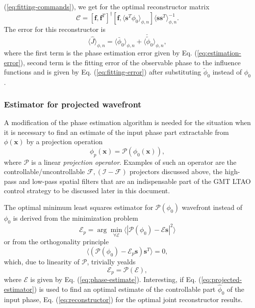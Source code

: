 (\ref{eq:fitting-commands}), we get for the optimal reconstructor matrix
\begin{equation} \label{eq:reconstructor}
	\mathcal{C} = [\bm{f},\bm{f}^{T}]^{\dagger}
	              [\bm{f}, \langle \bm{s}^{T} \phi_{0} \rangle_{\phi,n} ]
	              \langle \bm{s} \bm{s}^{T} \rangle_{\phi,n}^{-1}.
\end{equation}
The error for this reconstructor is
\begin{equation} \label{eq:reconstruction-error}
	\langle \hat{J} \rangle_{\phi,n} =
	\langle \bar{\phi}_{0} \rangle_{\phi,n} +
	\langle \check{\tilde{\phi}}_{0} \rangle_{\phi,n},
\end{equation}
where the first term is the phase estimation error given by Eq.
(\ref{eq:estimation-error}), second term is the fitting error of the
observable phase to the influence functions and is given by Eq.
(\ref{eq:fitting-error}) after substituting $\tilde{\phi}_{0}$ instead of
$\phi_{0}$.

\subsubsection{Estimator for projected wavefront}

A modification of the phase estimation algorithm is needed for the situation
when it is necessary to find an estimate of the input phase part extractable
from $\phi(\bm{x})$ by a projection operation
\begin{equation} \label{eq:projection}
	\phi_{p}(\bm{x}) = \mathcal{P} ( \phi_{0} (\bm{x}) ),
\end{equation}
where $\mathcal{P}$ is a linear \emph{projection operator}.  Examples of such an operator are the controllable/uncontrollable
$\mathcal{F,(I-F)}$
projectors discussed above, the high-pass and low-pass spatial filters that
are an indispensable part of the GMT LTAO control strategy to be discussed
later in this document.

The optimal minimum least squares estimator for
$\mathcal{P} (\phi_{0})$  wavefront
instead of $\phi_{0}$ is derived from the minimization problem
\begin{equation} \label{eq:projected-estimation}
	\mathcal{E}_{p} = \arg \min_{\forall \mathcal{E}}
	                  \langle |\mathcal{P} (\phi_{0}) -
	                           \mathcal{E} \bm{s}|^{2} \rangle
\end{equation}
or from the orthogonality principle
\begin{equation} \label{eq:projected-estimator-orthogonality-principle}
	\langle (\mathcal{P} (\phi_{0}) -
	         \mathcal{E}_{p} \bm{s}) \bm{s}^{T} \rangle = 0,
\end{equation}
which, due to linearity of $\mathcal{P}$, trivially yealds
\begin{equation} \label{eq:projected-estimator}
	\mathcal{E}_{p} = \mathcal{P(E)},
\end{equation}
where $\mathcal{E}$ is given by Eq. (\ref{eq:phase-estimate}). Interesting,
if Eq. (\ref{eq:projected-estimator}) is used to find an optimal estimate
of the controllable part $\hat{\phi}_{0}$ of the input phase, Eq.
(\ref{eq:reconstructor}) for the optimal joint reconstructor results.

